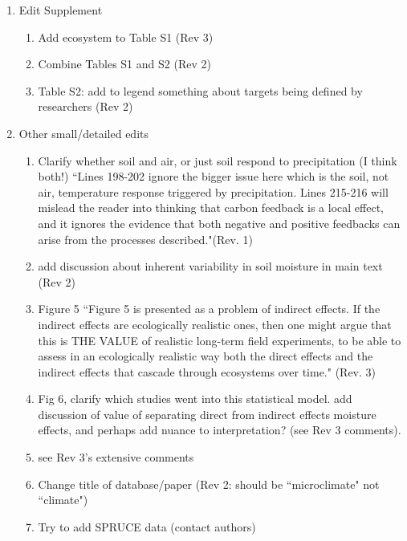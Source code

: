 \documentclass[12pt,a4paper]{article}
\begin{document}
\begin{enumerate}
\item Edit Supplement
\begin{enumerate}
\item Add ecosystem to Table S1 (Rev 3)
\item Combine Tables S1 and S2 (Rev 2)
\item Table S2: add to legend something about targets being defined by researchers (Rev 2)
\end{enumerate}
\item Other small/detailed edits 
\begin{enumerate}
\item Clarify whether soil and air, or just soil respond to precipitation (I think both!) ``Lines 198-202 ignore the bigger issue here which is the soil, not air, temperature response triggered by precipitation.  Lines 215-216 will mislead the reader into thinking that carbon feedback is a local effect, and it ignores the evidence that both negative and positive feedbacks can arise from the processes described."(Rev. 1)
\item add discussion about inherent variability in soil moisture in main text (Rev 2)
\item Figure 5 ``Figure 5 is presented as a
problem of indirect effects. If the indirect effects are ecologically realistic ones, then one might
argue that this is THE VALUE of realistic long-term field experiments, to be able to assess in an
ecologically realistic way both the direct effects and the indirect effects that cascade through
ecosystems over time." (Rev. 3)
\item Fig 6, clarify which studies went into this statistical model. add discussion of value of separating direct from indirect effects moisture effects, and perhaps add nuance to interpretation? (see Rev 3 comments). 
\item see Rev 3's extensive comments
\item Change title of database/paper (Rev 2: should be ``microclimate" not  ``climate")
\item Try to add SPRUCE data (contact authors)


\end{enumerate}
\end{enumerate}
\end{document}
